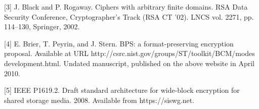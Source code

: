 [3] J. Black and P. Rogaway. Ciphers with arbitrary finite domains. RSA Data Security Conference, Cryptographer’s Track (RSA CT ’02). LNCS vol. 2271, pp. 114–130, Springer, 2002.

[4] E. Brier, T. Peyrin, and J. Stern. BPS: a format-preserving encryption proposal. Available at URL http://csrc.nist.gov/groups/ST/toolkit/BCM/modes development.html. Undated manuscript, published on the above website in April 2010.

[5] IEEE P1619.2. Draft standard architecture for wide-block encryption for shared storage media. 2008. Available from https://siswg.net.